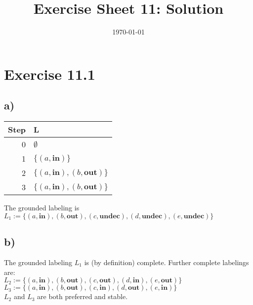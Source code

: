 \documentclass[a4paper]{article}
\begin{document}
\title{Exercise Sheet 11: Solution}
\author{}
\date{\today}

\section{Exercise 11.1}
\subsection{a)}
\begin{tabular}{r|l}
Step    & L\\\hline
0       & $\emptyset$\\
1       & $\{(a,\textbf{in})\}$\\
2       & $\{(a,\textbf{in}), (b,\textbf{out})\}$\\
3       & $\{(a,\textbf{in}), (b,\textbf{out})\}$\\
\end{tabular}

The grounded labeling is $L_1 := \{(a,\textbf{in}), (b,\textbf{out}), (c,\textbf{undec}), (d,\textbf{undec}), (e,\textbf{undec})\}$

\subsection{b)}
The grounded labeling $L_1$ is (by definition) complete. Further complete labelings are:\\
$L_2 := \{(a,\textbf{in}), (b,\textbf{out}), (c,\textbf{out}), (d,\textbf{in}), (e,\textbf{out})\}$\\
$L_3 := \{(a,\textbf{in}), (b,\textbf{out}), (c,\textbf{in}), (d,\textbf{out}), (e,\textbf{in})\}$\\
$L_2$ and $L_3$ are both preferred and stable.
\end{document}
